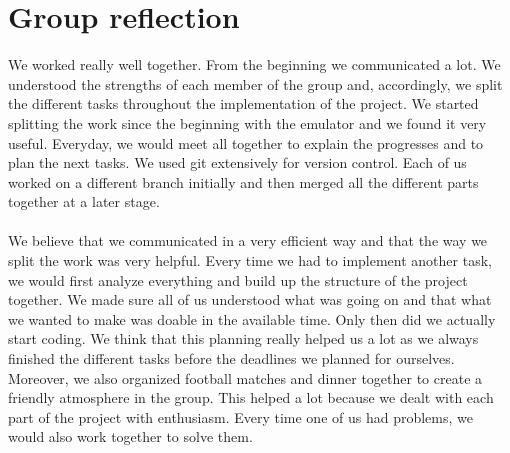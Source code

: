 \documentclass[a4paper]{article}
\begin{document}
\section{Group reflection}
We worked really well together. From the beginning we communicated a lot. We understood the strengths of each member of the group and, accordingly, we split the different tasks throughout the implementation of the project. We started splitting the work since the beginning with the emulator and we found it very useful. Everyday, we would meet all together to explain the progresses and to plan the next tasks. We used git extensively for version control. Each of us worked on a different branch initially and then merged all the different parts together at a later stage. 
\\\\
We believe that we communicated in a very efficient way and that the way we split the work was very helpful. Every time we had to implement another task, we would first analyze everything and build up the structure of the project together. We made sure all of us understood what was going on and that what we wanted to make was doable in the available time. Only then did we actually start coding. We think that this planning really helped us a lot as we always finished the different tasks before the deadlines we planned for ourselves. Moreover, we also organized football matches and dinner together to create a friendly atmosphere in the group. This helped a lot because we dealt with each part of the project with enthusiasm. Every time one of us had problems, we would also work together to solve them.
\end{document}
